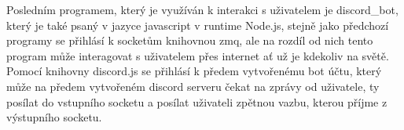 Posledním programem, který je využíván k interakci s uživatelem je discord\_bot, který je také psaný v jazyce javascript v runtime Node.js, stejně jako předchozí programy se přihlásí k socketům knihovnou zmq, ale na rozdíl od nich tento program může interagovat s uživatelem přes internet ať už je kdekoliv na světě.
Pomocí knihovny discord.js se přihlásí k předem vytvořenému bot účtu, který může na předem vytvořeném discord serveru čekat na zprávy od uživatele, ty posílat do vstupního socketu a posílat uživateli zpětnou vazbu, kterou příjme z výstupního socketu.

